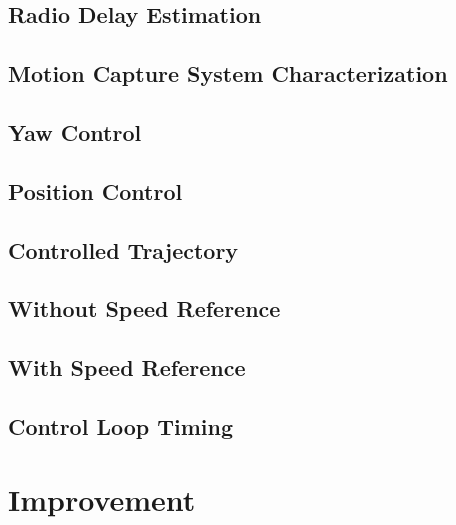 \documentclass[a4paper, 12pt]{report}
\begin{document}

\subsection{Radio Delay Estimation}
\subsection{Motion Capture System Characterization}
\subsection{Yaw Control}
\subsection{Position Control}
\subsection{Controlled Trajectory}
\subsection{Without Speed Reference}
\subsection{With Speed Reference}
\subsection{Control Loop Timing}

\newpage
\section{Improvement}
\end{document}
